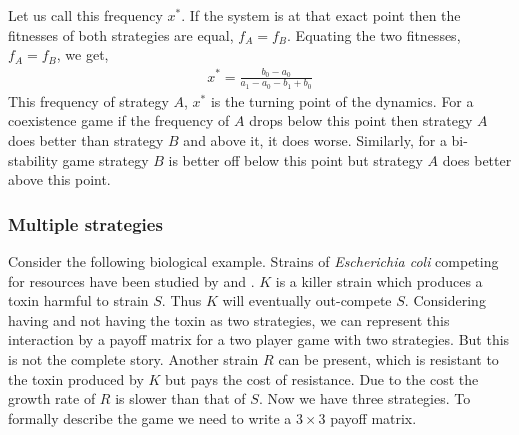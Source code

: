 \documentclass[oneside,11pt,a4paper]{book}
\begin{document}
Let us call this frequency $x^*$.
If the system is at that exact point then the fitnesses of both strategies are equal, $f_A = f_B$.
Equating the two fitnesses, $f_A = f_B$, we get,
%
\begin{eqnarray}
x^* = \frac{b_0 - a_0}{a_1 -a_0 -b_1 +b_0} 
\label{inteq}
\end{eqnarray}
%
This frequency of strategy $A$, $x^*$ is the turning point of the dynamics.
For a coexistence game if the frequency of $A$ drops below this point then strategy $A$ does better than strategy $B$ and above it, it does worse.
Similarly, for a bi-stability game strategy $B$ is better off below this point but strategy $A$ does better above this point.

\subsubsection{Multiple strategies}

Consider the following biological example.
Strains of \textit{Escherichia coli} competing for resources have been studied by \citet{kerr:2002xg} and \citet{czaran:2002ya}.
$K$ is a killer strain which produces a toxin harmful to strain $S$.
Thus $K$ will eventually out-compete $S$.
Considering having and not having the toxin as two strategies,
we can represent this interaction by a payoff matrix for a two player game with two strategies.
But this is not the complete story.
Another strain $R$ can be present, which is resistant to the toxin produced by $K$ but pays the cost of resistance.
Due to the cost the growth rate of $R$ is slower than that of $S$.
Now we have three strategies.
To formally describe the game we need to write a $3 \times 3$ payoff matrix.
\end{document}
